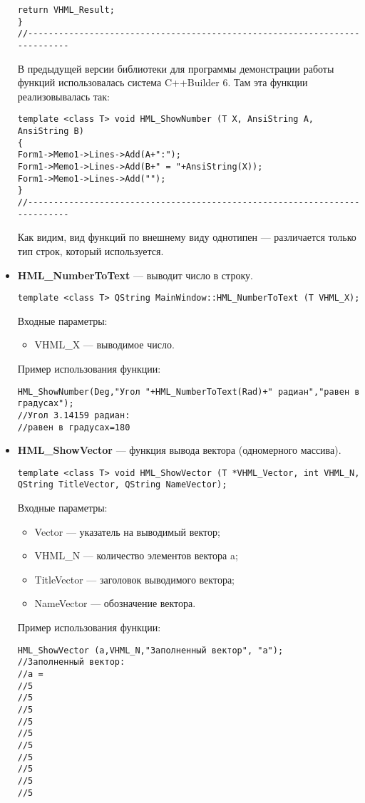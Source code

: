 \begin{itemize}
\begin{lstlisting}[label=examplefunction11, caption=Реализация функции HML\_ShowNumber]
    return VHML_Result;
}
//---------------------------------------------------------------------------
\end{lstlisting}

В предыдущей версии библиотеки для программы демонстрации работы функций использовалась система C++Builder 6. Там эта функции реализовывалась так:
\begin{lstlisting}[label=examplefunction12, caption=Реализация функции HML\_ShowNumber в C++Builder 6]
template <class T> void HML_ShowNumber (T X, AnsiString A, AnsiString B)
{
Form1->Memo1->Lines->Add(A+":");
Form1->Memo1->Lines->Add(B+" = "+AnsiString(X));
Form1->Memo1->Lines->Add("");
}
//---------------------------------------------------------------------------
\end{lstlisting}
Как видим, вид функций по внешнему виду однотипен --- различается только тип строк, который используется.

\item \textbf{HML\_NumberToText} --- выводит число в строку. 
\begin{lstlisting}[label=examplefunction16_2, caption=Синтаксис функции HML\_NumberToText]
template <class T> QString MainWindow::HML_NumberToText (T VHML_X);
\end{lstlisting}
Входные параметры: 
\begin{itemize}   
     \item VHML\_X --- выводимое число.
\end{itemize}
Пример использования функции:
\begin{lstlisting}[label=examplefunction17, caption=Пример использования HML\_NumberToText]
HML_ShowNumber(Deg,"Угол "+HML_NumberToText(Rad)+" радиан","равен в градусах");
//Угол 3.14159 радиан:
//равен в градусах=180
\end{lstlisting}

\item \textbf{HML\_ShowVector} --- функция вывода вектора (одномерного массива). 
\begin{lstlisting}[label=examplefunction14, caption=Синтаксис функции HML\_ShowVector]
template <class T> void HML_ShowVector (T *VHML_Vector, int VHML_N, QString TitleVector, QString NameVector);
\end{lstlisting}
Входные параметры: 
\begin{itemize}   
     \item Vector --- указатель на выводимый вектор;
     \item VHML\_N --- количество элементов вектора a;
     \item TitleVector --- заголовок выводимого вектора;
     \item NameVector --- обозначение вектора.
\end{itemize}
Пример использования функции:
\begin{lstlisting}[label=examplefunction15_2, caption=Пример использования HML\_ShowVector]
HML_ShowVector (a,VHML_N,"Заполненный вектор", "a");
//Заполненный вектор:
//a =	
//5
//5
//5
//5
//5
//5
//5
//5
//5
//5


\end{lstlisting}
\end{itemize}

